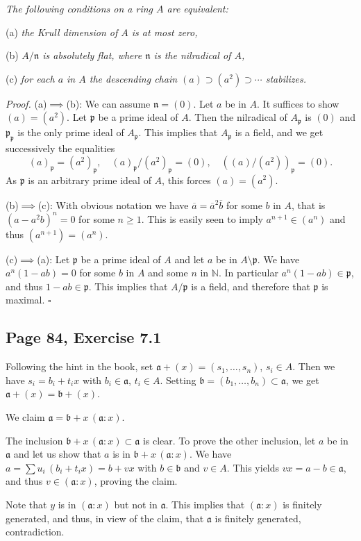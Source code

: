 \documentclass[parskip=half,fontsize=12pt]{scrartcl}%
\newcommand{\mf}{\mathfrak}
\newcommand{\aaa}{\mf a}
\newcommand{\bbb}{\mf b}
\newcommand{\nnn}{\mf n}
\newcommand{\ppp}{\mf p}
\begin{document}
\emph{The following conditions on a ring $A$ are equivalent:}

(a) \emph{the Krull dimension of $A$ is at most zero,}

(b) \emph{$A/\nnn$ is absolutely flat, where $\nnn$ is the nilradical of $A$,}

(c) \emph{for each $a$ in $A$ the descending chain $(a)\supset(a^2)\supset\cdots$ stabilizes.}

\emph{Proof.} (a)$\implies$(b): We can assume $\nnn=(0)$. Let $a$ be in $A$. It suffices to show $(a)=(a^2)$. Let $\ppp$ be a prime ideal of $A$. Then the nilradical of $A_\ppp$ is $(0)$ and $\ppp_\ppp$ is the only prime ideal of $A_\ppp$. This implies that $A_\ppp$ is a field, and we get successively the equalities 
$$
(a)_\ppp=(a^2)_\ppp,\quad(a)_\ppp/(a^2)_\ppp=(0),\quad((a)/(a^2))_\ppp=(0).
$$ 
As $\ppp$ is an arbitrary prime ideal of $A$, this forces $(a)=(a^2)$.

(b)$\implies$(c): With obvious notation we have $\overline a=\overline a^2\overline b$ for some $b$ in $A$, that is $(a-a^2b)^n=0$ for some $n\ge1$. This is easily seen to imply $a^{n+1}\in(a^n)$ and thus $(a^{n+1})=(a^n)$. 

(c)$\implies$(a): Let $\ppp$ be a prime ideal of $A$ and let $a$ be in $A\setminus\ppp$. We have $a^n(1-ab)=0$ for some $b$ in $A$ and some $n$ in $\mathbb N$. In particular $a^n(1-ab)\in\ppp$, and thus $1-ab\in\ppp$. This implies that $A/\ppp$ is a field, and therefore that $\ppp$ is maximal. $\square$

\subsection{Page 84, Exercise 7.1}%

Following the hint in the book, set $\aaa+(x)=(s_1,\dots,s_n)$, $s_i\in A$. Then we have $s_i=b_i+t_ix$ with $b_i\in\aaa$, $t_i\in A$. Setting $\bbb=(b_1,\dots,b_n)\subset\aaa$, we get $\aaa+(x)=\bbb+(x)$. 

We claim $\aaa=\bbb+x\,(\aaa:x)$. 

The inclusion $\bbb+x\,(\aaa:x)\subset\aaa$ is clear. To prove the other inclusion, let $a$ be in $\aaa$ and let us show that $a$ is in $\bbb+x\,(\aaa:x)$. We have $a=\sum u_i\,(b_i+t_ix)=b+vx$ with $b\in\bbb$ and $v\in A$. This yields $vx=a-b\in\aaa$, and thus $v\in(\aaa:x)$, proving the claim.

Note that $y$ is in $(\aaa:x)$ but not in $\aaa$. This implies that $(\aaa:x)$ is finitely generated, and thus, in view of the claim, that $\aaa$ is finitely generated, contradiction.
\end{document}
